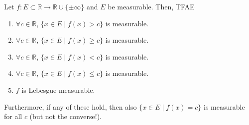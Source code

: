   \begin{theorem}[]
    Let $f: E \subset \mathbb{R} \to \mathbb{R} \cup \{ \pm \infty\}$ and $E$ be measurable. Then, TFAE 
    \begin{enumerate} 
      \item $\forall c \in \mathbb{R}$, $\{x \in E \mid f(x) > c\}$ is measurable. 
      \item $\forall c \in \mathbb{R}$, $\{x \in E \mid f(x) \geq c\}$ is measurable. 
      \item $\forall c \in \mathbb{R}$, $\{x \in E \mid f(x) < c\}$ is measurable. 
      \item $\forall c \in \mathbb{R}$, $\{x \in E \mid f(x) \leq c\}$ is measurable. 
      \item $f$ is Lebesgue measurable. 
    \end{enumerate}
    Furthermore, if any of these hold, then also $\{x \in E \mid f(x) = c \}$ is measurable for all $c$ (but not the converse!). 
  \end{theorem} 
